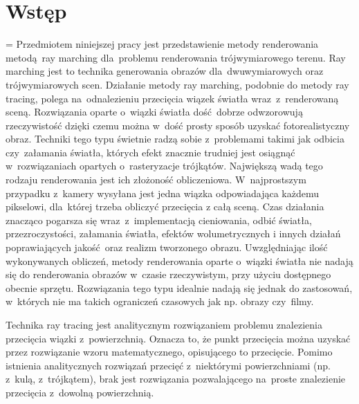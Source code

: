 \chapter{Wstęp}
\label{ch:wstep}
\emergencystretch=\maxdimen
Przedmiotem niniejszej pracy jest przedstawienie metody renderowania metodą ray marching dla~problemu renderowania trójwymiarowego terenu.
Ray marching jest to technika generowania obrazów dla~dwuwymiarowych oraz trójwymiarowych scen\cite{bib:gcraymarch}.
Działanie metody ray marching, podobnie do metody ray tracing, polega na~odnalezieniu przecięcia wiązek światła wraz~z~renderowaną sceną.
Rozwiązania oparte o~wiązki światła dość dobrze odwzorowują rzeczywistość dzięki czemu można w~dość prosty sposób uzyskać fotorealistyczny obraz.
Techniki tego typu świetnie radzą sobie z~problemami takimi jak odbicia czy~załamania światła, których efekt znacznie trudniej jest osiągnąć w~rozwiązaniach opartych o~rasteryzacje trójkątów.
Największą wadą tego rodzaju renderowania jest ich złożoność obliczeniowa. W~najprostszym przypadku z~kamery wysyłana jest jedna wiązka odpowiadająca każdemu pikselowi, dla~której trzeba obliczyć przecięcia z całą sceną.
Czas działania znacząco pogarsza się wraz~z~implementacją cieniowania, odbić światła, przezroczystości, załamania światła, efektów wolumetrycznych i innych działań poprawiających jakość oraz realizm tworzonego obrazu.
Uwzględniając ilość wykonywanych obliczeń, metody renderowania oparte o~wiązki światła nie nadają się do renderowania obrazów w~czasie rzeczywistym, przy użyciu dostępnego obecnie sprzętu.
Rozwiązania tego typu idealnie nadają się jednak do zastosowań, w~których nie ma takich ograniczeń czasowych jak np. obrazy czy~filmy.

Technika ray tracing jest analitycznym rozwiązaniem problemu znalezienia przecięcia wiązki z~powierzchnią.
Oznacza to, że punkt przecięcia można uzyskać przez rozwiązanie wzoru matematycznego, opisującego to przecięcie.
Pomimo istnienia analitycznych rozwiązań przecięć z~niektórymi powierzchniami (np. z~kulą, z~trójkątem), brak jest rozwiązania
pozwalającego na~proste znalezienie przecięcia z~dowolną powierzchnią.

